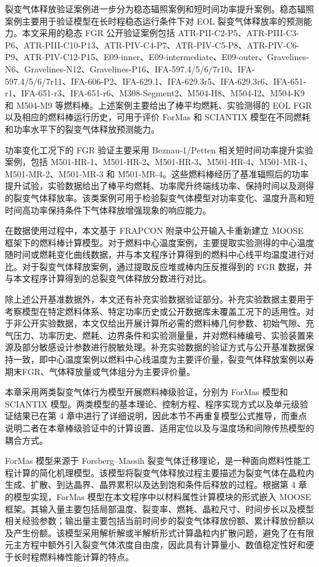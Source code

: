 裂变气体释放验证案例进一步分为稳态辐照案例和短时间功率提升案例。稳态辐照案例主要用于验证模型在长时程稳态运行条件下对 EOL 裂变气体释放率的预测能力。本文采用的稳态 FGR 公开验证案例包括 ATR-PII-C2-P5、ATR-PIII-C3-P6、ATR-PIII-C10-P13、ATR-PIV-C4-P7、ATR-PIV-C5-P8、ATR-PIV-C6-P9、ATR-PIV-C12-P15、E09-inner、E09-intermediate、E09-outer、Gravelines-N6、Gravelines-N12、Gravelines-P16、IFA-597.4/5/6/7r10、IFA-597.4/5/6/7r11、IFA-606-P2、IFA-629.1、IFA-629.3r5、IFA-629.3r6、IFA-651-r1、IFA-651-r3、IFA-651-r6、M308-Segment2、M504-H8、M504-I2、M504-K9 和 M504-M9 等燃料棒。上述案例主要给出了棒平均燃耗、实验测得的 EOL FGR 以及相应的燃料棒运行历史，可用于评价 ForMas 和 SCIANTIX 模型在不同燃耗和功率水平下的裂变气体释放预测能力。

功率变化工况下的 FGR 验证主要采用 Beznau-1/Petten 相关短时间功率提升实验案例，包括 M501-HR-1、M501-HR-2、M501-HR-3、M501-HR-4、M501-MR-1、M501-MR-2、M501-MR-3 和 M501-MR-4。这些燃料棒经历了基准辐照后的功率提升试验，实验数据给出了棒平均燃耗、功率爬升终端线功率、保持时间以及测得的裂变气体释放率。该类案例可用于检验裂变气体模型对功率变化、温度升高和短时间高功率保持条件下气体释放增强现象的响应能力。

在数据使用过程中，本文基于 FRAPCON 附录中公开输入卡重新建立 MOOSE 框架下的燃料棒计算模型。对于燃料中心温度案例，主要提取实验测得的中心温度随时间或燃耗变化曲线数据，并与本文程序计算得到的燃料中心线平均温度进行对比。对于裂变气体释放案例，通过提取反应堆或棒内压反推得到的 FGR 数据，并与本文程序计算得到的总裂变气体释放分数进行对比。

除上述公开基准数据外，本文还有补充实验数据验证部分。补充实验数据主要用于考察模型在特定燃料体系、特定功率历史或公开数据库未覆盖工况下的适用性。对于非公开实验数据，本文仅给出开展计算所必需的燃料棒几何参数、初始气隙、充气压力、功率历史、燃耗、边界条件和实验测量量，并对燃料棒编号、实验装置来源及部分敏感设计参数进行脱敏处理。补充实验数据的验证方式与公开基准数据保持一致，即中心温度案例以燃料中心线温度为主要评价量，裂变气体释放案例以寿期末FGR、气体释放量或气体组分为主要评价量。


本章采用两类裂变气体行为模型开展燃料棒级验证，分别为 ForMas 模型和 SCIAN\allowbreak TIX 模型。两类模型的基本理论、控制方程、程序实现方式以及单元级验证结果已在第 4 章中进行了详细说明，因此本节不再重复模型公式推导，而重点说明二者在本章棒级验证中的计算设置、适用定位以及与温度场和间隙传热模型的耦合方式。

ForMas 模型来源于 Forsberg--Massih 裂变气体迁移理论，是一种面向燃料性能工程计算的简化机理模型。该模型将裂变气体释放过程主要描述为裂变气体在晶粒内生成、扩散、到达晶界、晶界累积以及达到饱和条件后释放的过程。根据第 4 章的模型实现，ForMas 模型在本文程序中以材料属性计算模块的形式嵌入 MOOSE 框架。其输入量主要包括局部温度、裂变率、燃耗、晶粒尺寸、时间步长以及模型相关经验参数；输出量主要包括当前时间步的裂变气体释放份额、累计释放份额以及产生份额。该模型采用解析解或半解析形式计算晶粒内扩散问题，避免了在有限元主方程中额外引入裂变气体浓度自由度，因此具有计算量小、数值稳定性好和便于长时程燃料棒性能计算的特点。


